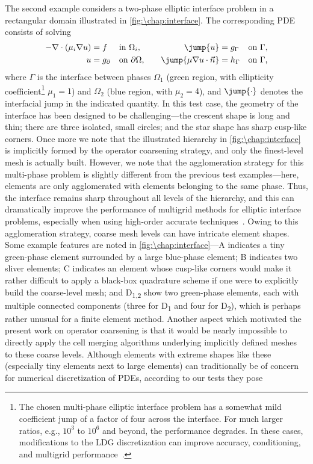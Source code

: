 The second example considers a two-phase elliptic interface problem in a rectangular domain illustrated in \cref{fig:\chap:interface}. The corresponding PDE consists of solving
\begin{equation}\label{eq:\chap:interface}
\begin{aligned}
-\nabla \cdot (\mu_i \nabla u) &= f &&\text{in } \Omega_i, &&& \jump{u} &= g_\Gamma &&\text{on } \Gamma, \\
u &= g_{\partial} &&\text{on } \partial \Omega, &&& \jump{\mu \nabla u \cdot \vec{n}} &= h_\Gamma &&\text{on } \Gamma,
\end{aligned}
\end{equation}
where $\Gamma$ is the interface between phases $\Omega_1$ (green region, with ellipticity coefficient\footnote{The chosen multi-phase elliptic interface problem has a somewhat mild coefficient jump of a factor of four across the interface. For much larger ratios, e.g., $10^3$ to $10^6$ and beyond, the performance degrades. In these cases, modifications to the LDG discretization can improve accuracy, conditioning, and multigrid performance~\cite{Saye_19_01}.} $\mu_1 = 1$) and $\Omega_2$ (blue region, with $\mu_2 = 4$), and $\jump{\cdot}$ denotes the interfacial jump in the indicated quantity. In this test case, the geometry of the interface has been designed to be challenging---the crescent shape is long and thin; there are three isolated, small circles; and the star shape has sharp cusp-like corners. Once more we note that the illustrated hierarchy in \cref{fig:\chap:interface} is implicitly formed by the operator coarsening strategy, and only the finest-level mesh is actually built. However, we note that the agglomeration strategy for this multi-phase problem is slightly different from the previous test examples---here, elements are only agglomerated with elements belonging to the same phase. Thus, the interface remains sharp throughout all levels of the hierarchy, and this can dramatically improve the performance of multigrid methods for elliptic interface problems, especially when using high-order accurate techniques~\cite{Saye_17_01}. Owing to this agglomeration strategy, coarse mesh levels can have intricate element shapes. Some example features are noted in \cref{fig:\chap:interface}---\textsf{A} indicates a tiny green-phase element surrounded by a large blue-phase element; \textsf{B} indicates two sliver elements; \textsf{C} indicates an element whose cusp-like corners would make it rather difficult to apply a black-box quadrature scheme if one were to explicitly build the coarse-level mesh; and \textsf{D\textsubscript{1,2}} show two green-phase elements, each with multiple connected components (three for \textsf{D\textsubscript{1}} and four for \textsf{D\textsubscript{2}}), which is perhaps rather unusual for a finite element method. Another aspect which motivated the present work on operator coarsening is that it would be nearly impossible to directly apply the cell merging algorithms underlying implicitly defined meshes~\cite{Saye_17_01} to these coarse levels. Although elements with extreme shapes like these (especially tiny elements next to large elements) can traditionally be of concern for numerical discretization of PDEs, according to our tests they pose 